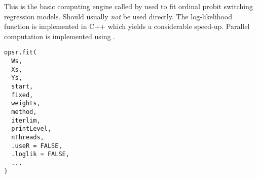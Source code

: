 %
\begin{Description}
This is the basic computing engine called by  used to fit ordinal
probit switching regression models. Should usually \emph{not} be used directly.
The log-likelihood function is implemented in C++ which yields a considerable
speed-up. Parallel computation is implemented using .
\end{Description}
%
\begin{Usage}
\begin{verbatim}
opsr.fit(
  Ws,
  Xs,
  Ys,
  start,
  fixed,
  weights,
  method,
  iterlim,
  printLevel,
  nThreads,
  .useR = FALSE,
  .loglik = FALSE,
  ...
)
\end{verbatim}
\end{Usage}
%
